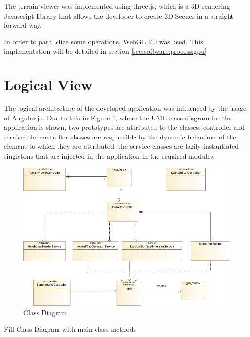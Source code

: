       The terrain viewer was implemented using three.js, which is a 3D rendering Javascript library that allows the developer to create 3D Scenes in a straight forward way. 
      
      In order to parallelize some operations, WebGL 2.0 was used. This implementation will be detailed in section \ref{sec:software:process:gpu}
    
  \section {Logical View} %
  
	  The logical architecture of the developed application was influenced by the usage of Angular.js. Due to this in Figure \ref{fig:class_diagram}, where the UML class diagram for the application is shown, two prototypes are attributed to the classes: controller and service; the controller classes are responsible by the dynamic behaviour of the element to which they are attributed; the service classes are lazily instantiated singletons that are injected in the application in the required modules.
    
      \begin{figure}[H]
    	\begin{center}
    	  \includegraphics[width=\textwidth]{images/diagrams/class.pdf}
    	\end{center}
    	\caption{Class Diagram}
    	\label{fig:class_diagram}
      \end{figure}
      
      \begin{notes}
      	\item Fill Class Diagram with main class methods
      \end{notes}
    
